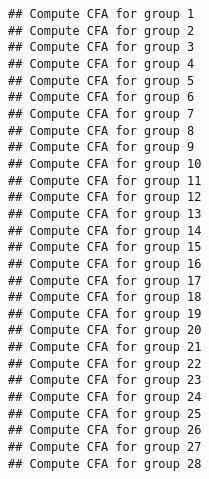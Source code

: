 \documentclass[
]{article}
\newenvironment{Shaded}{\begin{snugshade}}{\end{snugshade}}
\newcommand{\AttributeTok}[1]{\textcolor[rgb]{0.77,0.63,0.00}{#1}}
\newcommand{\CommentTok}[1]{\textcolor[rgb]{0.56,0.35,0.01}{\textit{#1}}}
\newcommand{\FloatTok}[1]{\textcolor[rgb]{0.00,0.00,0.81}{#1}}
\newcommand{\FunctionTok}[1]{\textcolor[rgb]{0.00,0.00,0.00}{#1}}
\newcommand{\NormalTok}[1]{#1}
\newcommand{\OtherTok}[1]{\textcolor[rgb]{0.56,0.35,0.01}{#1}}
\newcommand{\SpecialCharTok}[1]{\textcolor[rgb]{0.00,0.00,0.00}{#1}}
\newcommand{\StringTok}[1]{\textcolor[rgb]{0.31,0.60,0.02}{#1}}
\begin{document}
\begin{Shaded}
\end{Shaded}

\begin{verbatim}
## Compute CFA for group 1
## Compute CFA for group 2
## Compute CFA for group 3
## Compute CFA for group 4
## Compute CFA for group 5
## Compute CFA for group 6
## Compute CFA for group 7
## Compute CFA for group 8
## Compute CFA for group 9
## Compute CFA for group 10
## Compute CFA for group 11
## Compute CFA for group 12
## Compute CFA for group 13
## Compute CFA for group 14
## Compute CFA for group 15
## Compute CFA for group 16
## Compute CFA for group 17
## Compute CFA for group 18
## Compute CFA for group 19
## Compute CFA for group 20
## Compute CFA for group 21
## Compute CFA for group 22
## Compute CFA for group 23
## Compute CFA for group 24
## Compute CFA for group 25
## Compute CFA for group 26
## Compute CFA for group 27
## Compute CFA for group 28
\end{verbatim}

\begin{Shaded}
\end{Shaded}
\end{document}
